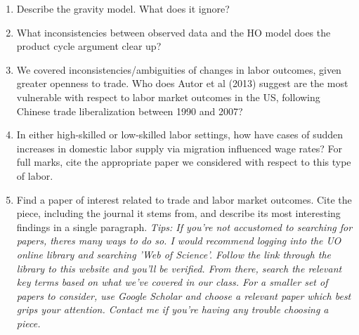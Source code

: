 \documentclass[12pt]{article}
\begin{document}
\begin{enumerate}[1)]
	
	\item Describe the gravity model. What does it ignore?
	
	\vspace{1.6in}
	
	\item What inconsistencies between observed data and the HO model does the product cycle argument clear up?
	
	\vspace{1.6in}
	
	\item We covered inconsistencies/ambiguities of changes in labor outcomes, given greater openness to trade. Who does Autor et al (2013) suggest are the most vulnerable with respect to labor market outcomes in the US, following Chinese trade liberalization between 1990 and 2007? 
	
	\vspace{1.6in}
	
	\newpage
	
	\item In either high-skilled or low-skilled labor settings, how have cases of sudden increases in domestic labor supply via migration influenced wage rates? For full marks, cite the appropriate paper we considered with respect to this type of labor.
	
	\vspace{2in}
	
	\item Find a paper of interest related to trade and labor market outcomes. Cite the piece, including the journal it stems from, and describe its most interesting findings in a single paragraph.
	{\it Tips: If you're not accustomed to searching for papers, theres many ways to do so. I would recommend logging into the UO online library and searching 'Web of Science'. Follow the link through the library to this website and you'll be verified. From there, search the relevant key terms based on what we've covered in our class.
	For a smaller set of papers to consider, use Google Scholar and choose a relevant paper which best grips your attention. 
	Contact me if you're having any trouble choosing a piece.}
	
	\vspace{1in}
	
\end{enumerate}
\end{document}

